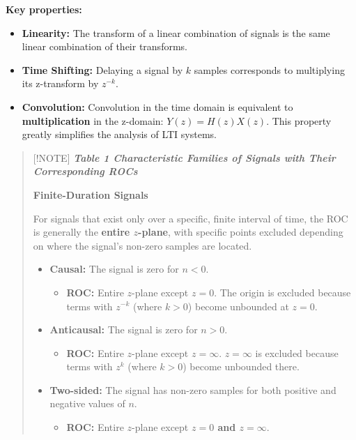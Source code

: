 \textbf{Key properties:}

\begin{itemize}
\tightlist
\item
  \textbf{Linearity:} The transform of a linear combination of signals
  is the same linear combination of their transforms.
\item
  \textbf{Time Shifting:} Delaying a signal by \(k\) samples corresponds
  to multiplying its z-transform by \(z^{-k}\).
\item
  \textbf{Convolution:} Convolution in the time domain is equivalent to
  \textbf{multiplication} in the z-domain: \(Y(z) = H(z)X(z)\). This
  property greatly simplifies the analysis of LTI systems.
\end{itemize}

\begin{quote}
{[}!NOTE{]} \textbf{\emph{Table 1 Characteristic Families of Signals
with Their Corresponding ROCs}}

\textbf{Finite-Duration Signals}

For signals that exist only over a specific, finite interval of time,
the ROC is generally the \textbf{entire \(z\)-plane}, with specific
points excluded depending on where the signal's non-zero samples are
located.

\begin{itemize}
\tightlist
\item
  \textbf{Causal:} The signal is zero for \(n < 0\).

  \begin{itemize}
  \tightlist
  \item
    \textbf{ROC:} Entire \(z\)-plane except \textbf{\(z = 0\)}. The
    origin is excluded because terms with \(z^{-k}\) (where \(k > 0\))
    become unbounded at \(z = 0\).
  \end{itemize}
\item
  \textbf{Anticausal:} The signal is zero for \(n > 0\).

  \begin{itemize}
  \tightlist
  \item
    \textbf{ROC:} Entire \(z\)-plane except \textbf{\(z = \infty\)}.
    \(z = \infty\) is excluded because terms with \(z^k\) (where
    \(k > 0\)) become unbounded there.
  \end{itemize}
\item
  \textbf{Two-sided:} The signal has non-zero samples for both positive
  and negative values of \(n\).

  \begin{itemize}
  \tightlist
  \item
    \textbf{ROC:} Entire \(z\)-plane except \textbf{\(z = 0\) and
    \(z = \infty\)}.
  \end{itemize}
\end{itemize}


\end{quote}
